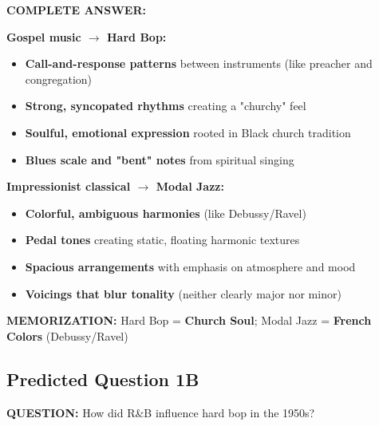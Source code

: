 \documentclass[11pt]{article}
\begin{document}
\begin{mdframed}[backgroundcolor=answercolor!10, linewidth=2pt]
\textbf{\textcolor{answercolor}{COMPLETE ANSWER:}}

\textbf{Gospel music $\rightarrow$ Hard Bop:}
\begin{itemize}[leftmargin=*, nosep]
    \item \textbf{Call-and-response patterns} between instruments (like preacher and congregation)
    \item \textbf{Strong, syncopated rhythms} creating a "churchy" feel
    \item \textbf{Soulful, emotional expression} rooted in Black church tradition
    \item \textbf{Blues scale and "bent" notes} from spiritual singing
\end{itemize}

\textbf{Impressionist classical $\rightarrow$ Modal Jazz:}
\begin{itemize}[leftmargin=*, nosep]
    \item \textbf{Colorful, ambiguous harmonies} (like Debussy/Ravel)
    \item \textbf{Pedal tones} creating static, floating harmonic textures
    \item \textbf{Spacious arrangements} with emphasis on atmosphere and mood
    \item \textbf{Voicings that blur tonality} (neither clearly major nor minor)
\end{itemize}

\vspace{5pt}
\end{mdframed}

\textbf{MEMORIZATION:} Hard Bop = \textbf{\textcolor{hardbop}{Church Soul}}; Modal Jazz = \textbf{\textcolor{modal}{French Colors}} (Debussy/Ravel)

\subsection*{Predicted Question 1B}

\begin{mdframed}[backgroundcolor=questioncolor!10, linewidth=2pt]
\textbf{\textcolor{questioncolor}{QUESTION:}} How did R\&B influence hard bop in the 1950s?
\end{mdframed}
\end{document}
